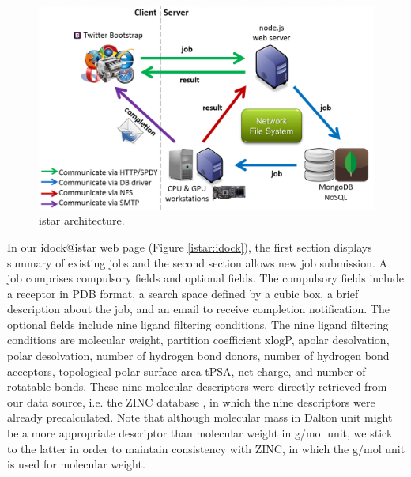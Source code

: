 \begin{figure}
\centering
\includegraphics[width=\linewidth]{../istar/Architecture.png}
\caption{istar architecture.}
\label{istar:Architecture}
\end{figure}

In our idock@istar web page (Figure \ref{istar:idock}), the first section displays summary of existing jobs and the second section allows new job submission. A job comprises compulsory fields and optional fields. The compulsory fields include a receptor in PDB format, a search space defined by a cubic box, a brief description about the job, and an email to receive completion notification. The optional fields include nine ligand filtering conditions. The nine ligand filtering conditions are molecular weight, partition coefficient xlogP, apolar desolvation, polar desolvation, number of hydrogen bond donors, number of hydrogen bond acceptors, topological polar surface area tPSA, net charge, and number of rotatable bonds. These nine molecular descriptors were directly retrieved from our data source, i.e. the ZINC database \citep{532,1178}, in which the nine descriptors were already precalculated. Note that although molecular mass in Dalton unit might be a more appropriate descriptor than molecular weight in g/mol unit, we stick to the latter in order to maintain consistency with ZINC, in which the g/mol unit is used for molecular weight.

